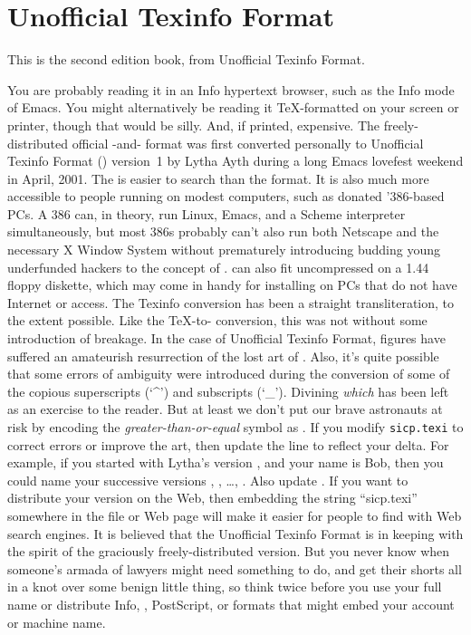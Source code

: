 \chapter*{Unofficial Texinfo Format}
\label{UTF}

This is the second edition  book, from Unofficial Texinfo Format.

You are probably reading it in an Info hypertext browser, such as the Info mode of Emacs.
You might alternatively be reading it \TeX{}-formatted on your screen or printer, though that would be silly.
And, if printed, expensive.
The freely-distributed official -and- format was first converted personally to Unofficial Texinfo Format () version~1 by Lytha Ayth during a long Emacs lovefest weekend in April, 2001.
The  is easier to search than the  format.
It is also much more accessible to people running on modest computers, such as donated '386-based PCs.
A 386 can, in theory, run Linux, Emacs, and a Scheme interpreter simultaneously, but most 386s probably can’t also run both Netscape and the necessary X Window System without prematurely introducing budding young underfunded hackers to the concept of .
 can also fit uncompressed on a 1.44 floppy diskette, which may come in handy for installing  on PCs that do not have Internet or  access.
The Texinfo conversion has been a straight transliteration, to the extent possible.
Like the \TeX{}-to- conversion, this was not without some introduction of breakage.
In the case of Unofficial Texinfo Format, figures have suffered an amateurish resurrection of the lost art of .
Also, it’s quite possible that some errors of ambiguity were introduced during the conversion of some of the copious superscripts (‘\^{}’) and subscripts (‘\_’).
Divining \emph{which} has been left as an exercise to the reader.
But at least we don’t put our brave astronauts at risk by encoding the \emph{greater-than-or-equal} symbol as .
If you modify \texttt{sicp.texi} to correct errors or improve the  art, then update the  line to reflect your delta.
For example, if you started with Lytha’s version , and your name is Bob, then you could name your successive versions , , …, .
Also update .
If you want to distribute your version on the Web, then embedding the string “sicp.texi” somewhere in the file or Web page will make it easier for people to find with Web search engines.
It is believed that the Unofficial Texinfo Format is in keeping with the spirit of the graciously freely-distributed  version.
But you never know when someone’s armada of lawyers might need something to do, and get their shorts all in a knot over some benign little thing, so think twice before you use your full name or distribute Info, , PostScript, or  formats that might embed your account or machine name.


